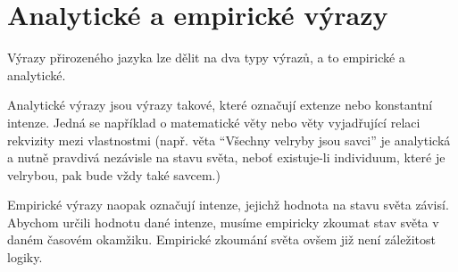 





\section{Analytické a empirické výrazy}

Výrazy přirozeného jazyka lze dělit na dva typy výrazů, a to empirické a analytické.

Analytické výrazy jsou výrazy takové, které označují extenze nebo konstantní intenze. Jedná se
například o matematické věty nebo věty vyjadřující relaci rekvizity mezi vlastnostmi (např. věta
``Všechny velryby jsou savci'' je analytická a nutně pravdivá nezávisle na stavu světa, neboť
existuje-li individuum, které je velrybou, pak bude vždy také savcem.)

Empirické výrazy naopak označují intenze, jejichž hodnota na stavu světa závisí. Abychom určili
hodnotu dané intenze, musíme empiricky zkoumat stav světa v daném časovém okamžiku. Empirické
zkoumání světa ovšem již není záležitost logiky.
\endinput
